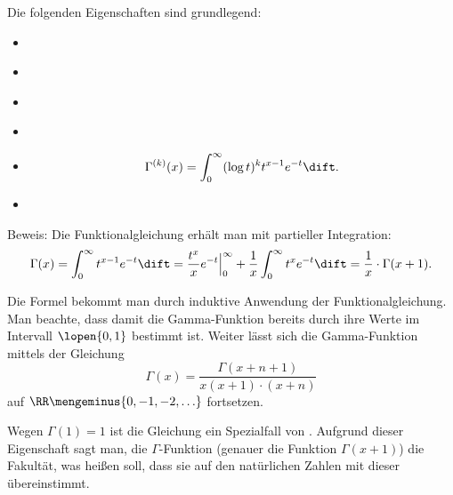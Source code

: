   \begin{antwort}
    Die folgenden Eigenschaften sind grundlegend:
    \begin{itemize}[4mm]
    \item[\desc{a}]\\[-3mm]
    \item[\desc{b}]\\[-3mm]
    \item[\desc{c}]\\[-3mm]
    \item[\desc{d}]\\[-3mm]
    \item[\desc{e}] 
      \[
      \Gamma^{(k)} (x) = \int_0^\infty (\log t)^k t^{x-1} e^{-t} \dift. 
      \]
    \item[\desc{f}]
    \end{itemize}

    \noindent
    Beweis:  Die Funktionalgleichung erhält man 
    mit partieller Integration:
    \[
    \Gamma(x)=
    \int_0^\infty  t^{x-1}e^{-t} \dift = 
    \frac{t^{x}}{x} e^{-t} \Big|_0^\infty + 
    \frac{1}{x} \int_0^\infty t^{x}e^{-t} \dift = 
    \frac{1}{x} \cdot \Gamma(x+1).
    \]

    \medskip
    \noindent
     Die Formel bekommt man durch induktive Anwendung der 
    Funktionalgleichung. Man beachte, dass damit die Gamma-Funktion 
    bereits durch ihre Werte im Intervall $\lopen{0,1}$ bestimmt ist. Weiter 
    lässt sich die Gamma-Funktion mittels der Gleichung 
    \[
    \Gamma(x) = \frac{ \Gamma(x+n+1) }{ x(x+1) \cdot (x+n) }
    \]
    auf $\RR \mengeminus\{0,-1,-2,\ldots \}$ fortsetzen. 

    \medskip
    \noindent
     Wegen $\Gamma(1)=1$ ist die 
    Gleichung ein Spezialfall von . 
    Aufgrund dieser Eigenschaft sagt man, 
    die $\Gamma$-Funktion (genauer die 
    Funktion $\Gamma(x+1)$)  die Fakultät, was heißen 
    soll, dass sie auf den natürlichen Zahlen mit dieser übereinstimmt.


\end{antwort}
